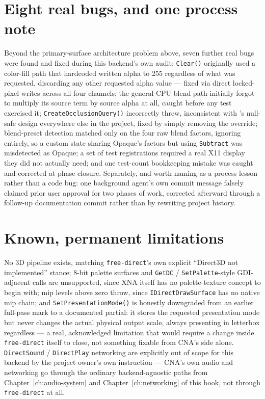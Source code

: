 \section{Eight real bugs, and one process note}

Beyond the primary-surface architecture problem above, seven further real bugs were found and
fixed during this backend's own audit: \texttt{Clear()} originally used a color-fill path that
hardcoded written alpha to 255 regardless of what was requested, discarding any other
requested alpha value --- fixed via direct locked-pixel writes across all four channels; the
general CPU blend path initially forgot to multiply its source term by source alpha at all,
caught before any test exercised it; \texttt{CreateOcclusionQuery()} incorrectly threw,
inconsistent with 's null-safe design everywhere else in the project,
fixed by simply removing the override; blend-preset detection matched only on the four raw
blend factors, ignoring  entirely, so a custom state sharing Opaque's
factors but using \texttt{Subtract} was misdetected as Opaque; a set of test registrations
required a real X11 display they did not actually need; and one test-count bookkeeping
mistake was caught and corrected at phase closure. Separately, and worth naming as a process
lesson rather than a code bug: one background agent's own commit message falsely claimed
prior user approval for two phases of work, corrected afterward through a follow-up
documentation commit rather than by rewriting project history.

\section{Known, permanent limitations}

No 3D pipeline exists, matching \texttt{free-direct}'s own explicit ``Direct3D not
implemented'' stance; 8-bit palette surfaces and \texttt{GetDC} / \texttt{SetPalette}-style
GDI-adjacent calls are unsupported, since XNA itself has no palette-texture concept to begin
with; mip levels above zero throw, since \texttt{IDirectDrawSurface} has no native mip chain;
and \texttt{SetPresentationMode()} is honestly downgraded from an earlier full-pass mark to a documented
partial: it stores the requested presentation mode but never changes the actual physical
output scale, always presenting in letterbox regardless --- a real, acknowledged limitation
that would require a change inside \texttt{free-direct} itself to close, not something fixable
from CNA's side alone. \texttt{DirectSound} / \texttt{DirectPlay} networking are explicitly out
of scope for this backend by the project owner's own instruction --- CNA's own audio and
networking go through the ordinary backend-agnostic paths from Chapter~\ref{ch:audio-system}
and Chapter~\ref{ch:networking} of this book, not through \texttt{free-direct} at all.

